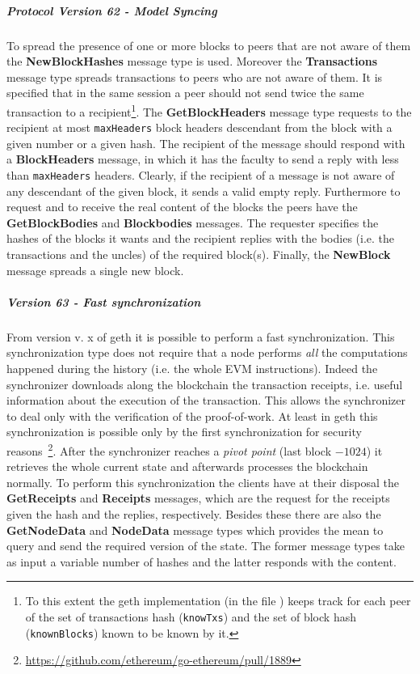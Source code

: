 \subparagraph{Protocol Version 62 - Model Syncing}
To spread the presence of one or more blocks to peers that are not aware
of them the \textbf{NewBlockHashes} message type is used.
Moreover the \textbf{Transactions} message type spreads transactions to
peers who are not aware of them. It is specified that
in the same session a peer should not send twice the same
transaction to a
recipient\footnote{To this extent the
geth implementation (in the file ) keeps track for each
peer of the set of transactions hash (\texttt{knowTxs}) and the set of
block hash (\texttt{knownBlocks}) known to be known by it.}.
The \textbf{GetBlockHeaders} message type requests to the recipient at most
\texttt{maxHeaders} block headers descendant from the block with a given
number or a given hash.
The recipient of the message should respond with a \textbf{BlockHeaders}
message, in which it has the faculty to send a reply with less than
\texttt{maxHeaders} headers. Clearly, if the recipient of a message
is not aware of any descendant of the given block, it sends a valid empty
reply. Furthermore to request and to receive the real content of the blocks the
peers have the \textbf{GetBlockBodies} and \textbf{Blockbodies} messages.
The requester specifies the hashes of the blocks it wants and the recipient
replies with the bodies (i.e. the transactions and the uncles) of
the required block(s).
Finally, the \textbf{NewBlock} message spreads a single new block.

\subparagraph{Version 63 - Fast synchronization}
From version v. x of geth it is possible to perform a fast synchronization.
This synchronization type does not require that a node performs \emph{all} the
computations happened during the history (i.e. the whole EVM instructions).
Indeed the synchronizer downloads along the blockchain the transaction receipts,
i.e. useful information about the execution of the transaction.
This allows the synchronizer to deal only with the verification of the
proof-of-work. At least in geth this synchronization is possible only by the
first synchronization for security
reasons~\footnote{\url{https://github.com/ethereum/go-ethereum/pull/1889}}.
After the synchronizer reaches a \textit{pivot point} (last block $- 1024$) it
retrieves the whole current state and afterwards processes the blockchain
normally.
To perform this synchronization the clients have at their disposal
the \textbf{GetReceipts} and \textbf{Receipts} messages, which are the
request for the receipts given the hash and the replies, respectively.
Besides these there are also the \textbf{GetNodeData} and
\textbf{NodeData} message types which provides the mean to query and
send the required version of the state. The former message types take as
input a variable number of hashes and the latter responds with the content.




